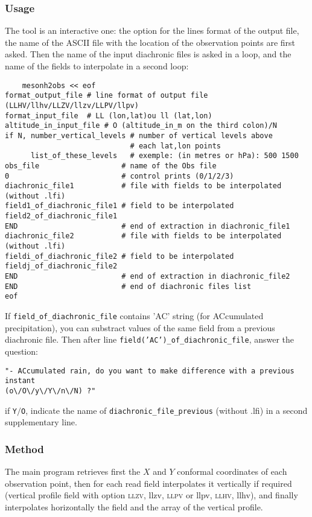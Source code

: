 \subsubsection{Usage}
The tool is an interactive one: the option for the lines format of the output
file, the name of the ASCII file with the location of
the observation points are first asked. 
Then the name of the input diachronic files is asked in a loop, and the 
name of the fields to interpolate in a second loop:
\begin{verbatim}
    mesonh2obs << eof
format_output_file # line format of output file (LLHV/llhv/LLZV/llzv/LLPV/llpv)
format_input_file  # LL (lon,lat)ou ll (lat,lon)
altitude_in_input_file # O (altitude_in_m on the third colon)/N 
if N, number_vertical_levels # number of vertical levels above 
                             # each lat,lon points
      list_of_these_levels   # exemple: (in metres or hPa): 500 1500
obs_file                   # name of the Obs file 
0                          # control prints (0/1/2/3)
diachronic_file1           # file with fields to be interpolated (without .lfi)
field1_of_diachronic_file1 # field to be interpolated
field2_of_diachronic_file1
END                        # end of extraction in diachronic_file1
diachronic_file2           # file with fields to be interpolated (without .lfi)
fieldi_of_diachronic_file2 # field to be interpolated
fieldj_of_diachronic_file2
END                        # end of extraction in diachronic_file2
END                        # end of diachronic files list
eof
\end{verbatim}
 
 If \texttt{field\_of\_diachronic\_file} contains 'AC' string 
(for ACcumulated precipitation), you can substract values of the same field
from a previous diachronic file. Then after line 
\texttt{field('AC')\_of\_diachronic\_file}, answer the question: 
\begin{verbatim}
"- ACcumulated rain, do you want to make difference with a previous instant
(o\/O\/y\/Y\/n\/N) ?"
\end{verbatim}
if \texttt{Y$/$O}, indicate the name of \texttt{diachronic\_file\_previous}
(without .lfi) in a second supplementary line. 

\subsubsection{Method}
The main program retrieves first the $X$ and $Y$ conformal coordinates of each 
observation point, then for each read field interpolates it vertically 
if required (vertical profile field with option \textsc{llzv}, llzv, \textsc{llpv} or llpv, \textsc{llhv}, llhv),
and finally interpolates horizontally the field and the array of the vertical
profile.





